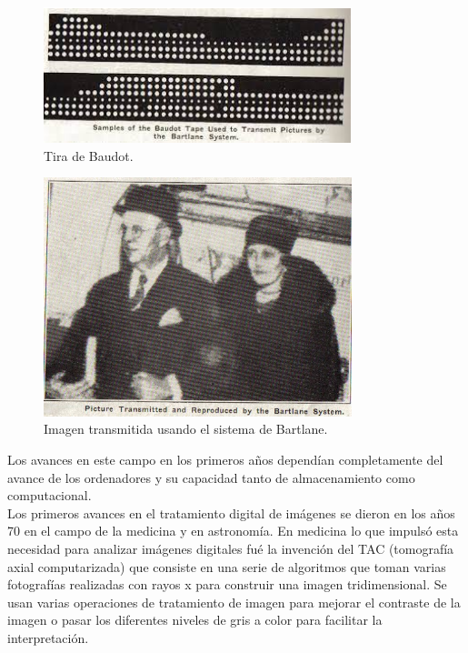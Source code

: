 \documentclass[a4paper,12pt]{report}
\begin{document}
\begin{figure}[h]
\centering
\includegraphics[width=0.8\textwidth]{imagenes/telegrafo}
\caption{Tira de Baudot.}
\label{telegrafo}
\end{figure}

\begin{figure}[h]
\centering
\includegraphics[width=0.8\textwidth]{imagenes/1digital}
\caption{Imagen transmitida usando el sistema de Bartlane.}
\label{estructurajupyter}
\end{figure}

Los avances en este campo en los primeros años dependían completamente del avance de los ordenadores y su capacidad tanto de almacenamiento como computacional.\\

Los primeros avances en el tratamiento digital de imágenes se dieron en los años 70 en el campo de la medicina y en astronomía. En medicina lo que impulsó esta necesidad para analizar imágenes digitales fué la invención del TAC (tomografía axial computarizada) que consiste en una serie de algoritmos que toman varias fotografías realizadas con rayos x para construir una imagen tridimensional. Se usan varias operaciones de tratamiento de imagen para mejorar el contraste de la imagen o pasar los diferentes niveles de gris a color para facilitar la interpretación.\\
\end{document}
